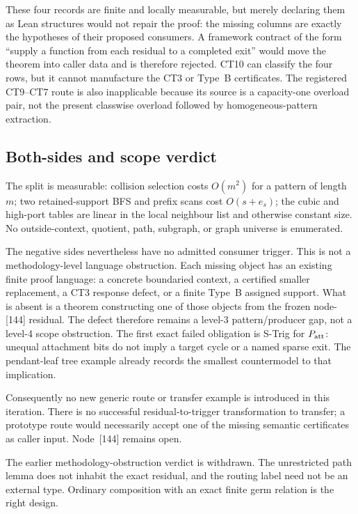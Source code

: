 \documentclass[11pt]{article}
\begin{document}
These four records are finite and locally measurable, but merely declaring
them as Lean structures would not repair the proof: the missing columns are
exactly the hypotheses of their proposed consumers.  A framework contract of
the form ``supply a function from each residual to a completed exit'' would
move the theorem into caller data and is therefore rejected.  CT10 can
classify the four rows, but it cannot manufacture the CT3 or Type~B
certificates.  The registered CT9--CT7 route is also inapplicable because its
source is a capacity-one overload pair, not the present classwise overload
followed by homogeneous-pattern extraction.

\subsection*{Both-sides and scope verdict}

The split is measurable: collision selection costs $O(m^2)$ for a pattern of
length $m$; two retained-support BFS and prefix scans cost $O(s+e_s)$; the
cubic and high-port tables are linear in the local neighbour list and
otherwise constant size.  No outside-context, quotient, path, subgraph, or
graph universe is enumerated.

The negative sides nevertheless have no admitted consumer trigger.  This is
not a methodology-level language obstruction.  Each missing object has an
existing finite proof language: a concrete boundaried context, a certified
smaller replacement, a CT3 response defect, or a finite Type~B assigned
support.  What is absent is a theorem constructing one of those objects from
the frozen node-[144] residual.  The defect therefore remains a level-3
pattern/producer gap, not a level-4 scope obstruction.  The first exact failed
obligation is S-Trig for $P_{\rm att}$: unequal attachment bits do not imply a
target cycle or a named sparse exit.  The pendant-leaf tree example already
records the smallest countermodel to that implication.

Consequently no new generic route or transfer example is introduced in this
iteration.  There is no successful residual-to-trigger transformation to
transfer; a prototype route would necessarily accept one of the missing
semantic certificates as caller input.  Node~[144] remains open.

The earlier methodology-obstruction verdict is withdrawn.  The unrestricted
path lemma does not inhabit the exact residual, and the routing label need not
be an external type.  Ordinary composition with an exact finite germ relation
is the right design.
\end{document}
